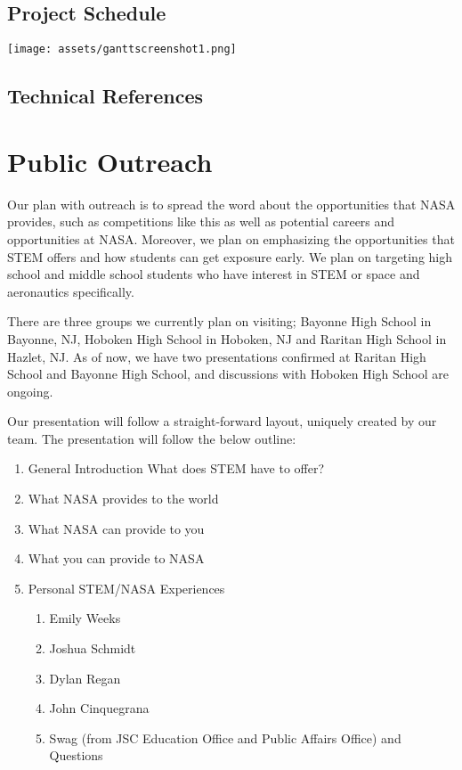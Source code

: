 \documentclass{article}
\let\Oldsection\section
\renewcommand{\section}{\FloatBarrier\Oldsection}
\let\Oldsubsection\subsection
\renewcommand{\subsection}{\FloatBarrier\Oldsubsection}
\begin{document}
\newpage

\subsection{Project Schedule}

\texttt{[image: assets/ganttscreenshot1.png]}

\newpage

\subsection{Technical References}

\printbibliography

\newpage

\section{Public Outreach}

Our plan with outreach is to spread the word about the opportunities that NASA provides, such as competitions like this as well as potential careers and opportunities at NASA. Moreover, we plan on emphasizing the opportunities that STEM offers and how students can get exposure early. We plan on targeting high school and middle school students who have interest in STEM or space and aeronautics specifically.

There are three groups we currently plan on visiting; Bayonne High School in Bayonne, NJ, Hoboken High School in Hoboken, NJ and Raritan High School in Hazlet, NJ. As of now, we have two presentations confirmed at Raritan High School and Bayonne High School, and discussions with Hoboken High School are ongoing.

Our presentation will follow a straight-forward layout, uniquely created by our team. The presentation will follow the below outline:

\begin{enumerate}
\item General Introduction What does STEM have to offer?
\item What NASA provides to the world
\item What NASA can provide to you
\item What you can provide to NASA
\item Personal STEM/NASA Experiences
\begin{enumerate}
\item Emily Weeks
\item Joshua Schmidt
\item Dylan Regan
\item John Cinquegrana
\item Swag (from JSC Education Office and Public Affairs Office) and Questions
\end{enumerate}
\end{enumerate}
\end{document}
